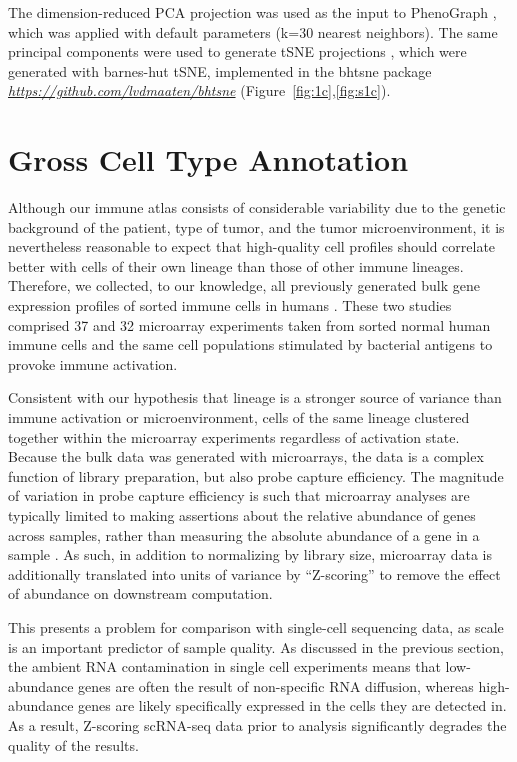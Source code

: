 The dimension-reduced PCA projection was used as the input to PhenoGraph \citep{Levine2015}, which was applied with default parameters (k=30 nearest neighbors). 
The same principal components were used to generate tSNE projections \citep{Maaten2008}, which were generated with barnes-hut tSNE, implemented in the bhtsne package \href{https://github.com/lvdmaaten/bhtsne}{\emph{https://github.com/lvdmaaten/bhtsne}} (Figure~\ref{fig:1c},\ref{fig:s1c}).

\section{Gross Cell Type Annotation}

Although our immune atlas consists of considerable variability due to the genetic background of the patient, type of tumor, and the tumor microenvironment, it is nevertheless reasonable to expect that high-quality cell profiles should correlate better with cells of their own lineage than those of other immune lineages. 
Therefore, we collected, to our knowledge, all previously generated bulk gene expression profiles of sorted immune cells in humans \citep{Novershtern2011,Jeffrey2006}.
These two studies comprised 37 and 32 microarray experiments taken from sorted normal human immune cells and the same cell populations stimulated by bacterial antigens to provoke immune activation. 

Consistent with our hypothesis that lineage is a stronger source of variance than immune activation or microenvironment, cells of the same lineage clustered together within the microarray experiments regardless of activation state. 
Because the bulk data was generated with microarrays, the data is a complex function of library preparation, but also probe capture efficiency. 
The magnitude of variation in probe capture efficiency is such that microarray analyses are typically limited to making assertions about the relative abundance of genes across samples, rather than measuring the absolute abundance of a gene in a sample \citep{Tusher2001}. 
As such, in addition to normalizing by library size, microarray data is additionally translated into units of variance by ``Z-scoring'' to remove the effect of abundance on downstream computation. 

This presents a problem for comparison with single-cell sequencing data, as scale is an important predictor of sample quality. As discussed in the previous section, the ambient RNA contamination in single cell experiments means that low-abundance genes are often the result of non-specific RNA diffusion, whereas high-abundance genes are likely specifically expressed in the cells they are detected in. 
As a result, Z-scoring scRNA-seq data prior to analysis significantly degrades the quality of the results. 

